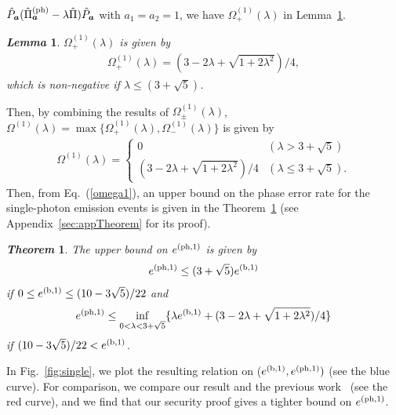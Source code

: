 \documentclass[prl,twocolumn,superscriptaddress,nofootinbib]{revtex4}
\newtheorem{theorem}{{\it \bf Theorem}}
\newtheorem{lemma}{{\it \bf Lemma}}
\def\U#1{{\rm #1}}
\begin{document}
$\hat{P}_{\bm{a}}(\hat{\Pi}^{\U{(ph)}}_{\bm{a}}-\lambda\hat{\Pi})\hat{P}_{\bm{a}}$ with $a_1=a_2=1$,
we have $\Omega^{(1)}_+(\lambda)$ in Lemma~\ref{lemma1}.
\begin{lemma}
  \label{lemma1}
$\Omega^{(1)}_+(\lambda)$ is given by
  \begin{align}
\Omega^{(1)}_+(\lambda)=(3-2\lambda+\sqrt{1+2\lambda^2})/4,
  \end{align}
  which is non-negative if $\lambda\leq (3+\sqrt{5})$. 
\end{lemma}
Then, by combining the results of $\Omega^{(1)}_\pm(\lambda)$,
$\Omega^{(1)}(\lambda)=\max\{\Omega^{(1)}_+(\lambda),\Omega^{(1)}_-(\lambda)\}$ is given by
\begin{align}
  \Omega^{(1)}(\lambda)=
  \begin{cases}
    0&(\lambda> 3+\sqrt{5})\\
    (3-2\lambda+\sqrt{1+2\lambda^2})/4 &(\lambda\leq 3+\sqrt{5}).
    \label{omega1}
    \end{cases}
\end{align}
Then, from Eq.~(\ref{omega1}),
an upper bound on the phase error rate for the single-photon emission events is given in the Theorem~\ref{theorem1}
(see Appendix~\ref{sec:appTheorem} for its proof). 
\begin{theorem}
  \label{theorem1}
  The upper bound on $e^{(\U{ph},1)}$ is given by
  \begin{align}
e^{(\U{ph},1)}\leq (3+\sqrt{5})e^{(\U{b},1)} 
  \end{align}
  if $0\leq e^{(\U{b},1)}\leq (10-3\sqrt{5})/22$ and 
  \begin{align}
    e^{(\U{ph},1)}\leq \inf_{0<\lambda <3+\sqrt{5}}\{\lambda e^{(\U{b},1)}+(3-2\lambda+\sqrt{1+2\lambda^2})/4\}
    \label{nu1high}
  \end{align}
if $(10-3\sqrt{5})/22<e^{(\U{b},1)}$.
\end{theorem}
    
In Fig.~\ref{fig:single}, we plot the resulting relation on ($e^{(\U{b},1)},e^{(\U{ph},1)})$ (see the blue curve). 
For comparison, we compare our result and the previous work~\cite{Kiyoshi2012dps} (see the red curve),
and we find that our security proof gives a tighter bound on $e^{(\U{ph},1)}$. 
\end{document}
